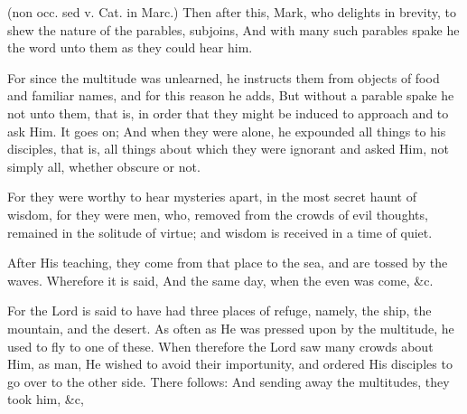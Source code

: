  (non occ. sed v. Cat. in Marc.) Then after this, Mark, who delights in brevity, to shew the nature of the parables, subjoins, And with many such parables spake he the word unto them as they could hear him.

 For since the multitude was unlearned, he instructs them from objects of food and familiar names, and for this reason he adds, But without a parable spake he not unto them, that is, in order that they might be induced to approach and to ask Him. It goes on; And when they were alone, he expounded all things to his disciples, that is, all things about which they were ignorant and asked Him, not simply all, whether obscure or not.

 For they were worthy to hear mysteries apart, in the most secret haunt of wisdom, for they were men, who, removed from the crowds of evil thoughts, remained in the solitude of virtue; and wisdom is received in a time of quiet.

 

 After His teaching, they come from that place to the sea, and are tossed by the waves. Wherefore it is said, And the same day, when the even was come, \&c.

 For the Lord is said to have had three places of refuge, namely, the ship, the mountain, and the desert. As often as He was pressed upon by the multitude, he used to fly to one of these. When therefore the Lord saw many crowds about Him, as man, He wished to avoid their importunity, and ordered His disciples to go over to the other side. There follows: And sending away the multitudes, they took him, \&c,

